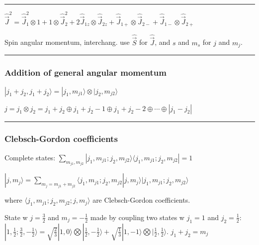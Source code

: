 \hrule height 0.05pt

$\widehat{\vec{J}}^2 = \widehat{\vec{J}}^2_1 \otimes 1 + 1 \otimes \widehat{\vec{J}}_2^2 + 2 \widehat{\vec{J}}_{1z} \otimes \widehat{\vec{J}}_{2z} + \widehat{\vec{J}}_{1+} \otimes \widehat{\vec{J}}_{2-} + \widehat{\vec{J}}_{1-} \otimes \widehat{\vec{J}}_{2+}$

Spin angular momentum, interchang. use $\widehat{\vec{S}}$ for $\widehat{\vec{J}}$, and $s$ and $m_s$ for $j$ and $m_j$.

\hrule height 0.05pt

\subsubsection{Addition of general angular momentum}

$|j_1 + j_2, j_1 + j_2 \rangle = | j_1, m_{j1} \rangle \otimes |j_2, m_{j2} \rangle$

$j = j_1 \otimes j_2 = j_1 + j_2 \oplus j_1 + j_2 - 1 \oplus j_1 + j_2 - 2 \oplus \cdots \oplus |j_1 - j_2|$

\hrule height 0.05pt

\subsubsection{Clebsch-Gordon coefficients}


\hfill

Complete states: $\sum_{m_{j1}, m_{j2}} |j_1, m_{j1}; j_2, m_{j2} \rangle \langle j_1, m_{j1}; j_2, m_{j2}| = 1$

$|j, m_j \rangle = \sum_{m_j = m_{j1} + m_{j2}} \langle j_1, m_{j1}; j_2, m_{j2} | j, m_j \rangle | j_1, m_{j1}; j_2, m_{j2} \rangle$

where $\langle j_1, m_{j1}; j_2, m_{j2}; j, m_j \rangle$ are Clebsch-Gordon coefficients.

State w $j=\frac{3}{2}$ and $m_j = -\frac{1}{2}$ made by coupling two states w $j_1 = 1$ and $j_2 = \frac{1}{2}$: $|1, \frac{1}{2}; \frac{3}{2}, -\frac{1}{2} \rangle = \sqrt{\frac{2}{3}} | 1, 0 \rangle \bigotimes | \frac{1}{2}, -\frac{1}{2} \rangle + \sqrt{\frac{1}{3}} | 1, -1 \rangle \bigotimes | \frac{1}{2}, \frac{1}{2} \rangle$. $j_1 + j_2 = m_j$
